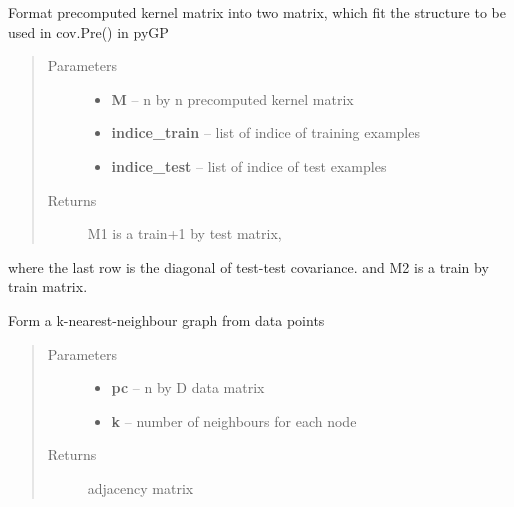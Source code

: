 \documentclass[letterpaper,10pt,english]{sphinxmanual}
\begin{document}
\begin{fulllineitems}
\label{pyGPs.GraphExtensions:pyGPs.GraphExtensions.graphUtil.formKernelMatrix}
Format precomputed kernel matrix into two matrix,
which fit the structure to be used in cov.Pre() in pyGP
\begin{quote}\begin{description}
\item[{Parameters}] \leavevmode\begin{itemize}
\item {} 
\textbf{M} -- n by n precomputed kernel matrix

\item {} 
\textbf{indice\_train} -- list of indice of training examples

\item {} 
\textbf{indice\_test} -- list of indice of test examples

\end{itemize}

\item[{Returns}] \leavevmode
M1 is a train+1 by test matrix,

\end{description}\end{quote}

where the last row is the diagonal of test-test covariance.
and M2 is a train by train matrix.

\end{fulllineitems}


\begin{fulllineitems}
\label{pyGPs.GraphExtensions:pyGPs.GraphExtensions.graphUtil.formKnnGraph}
Form a k-nearest-neighbour graph from data points
\begin{quote}\begin{description}
\item[{Parameters}] \leavevmode\begin{itemize}
\item {} 
\textbf{pc} -- n by D data matrix

\item {} 
\textbf{k} -- number of neighbours for each node

\end{itemize}

\item[{Returns}] \leavevmode
adjacency matrix

\end{description}\end{quote}

\end{fulllineitems}
\end{document}
